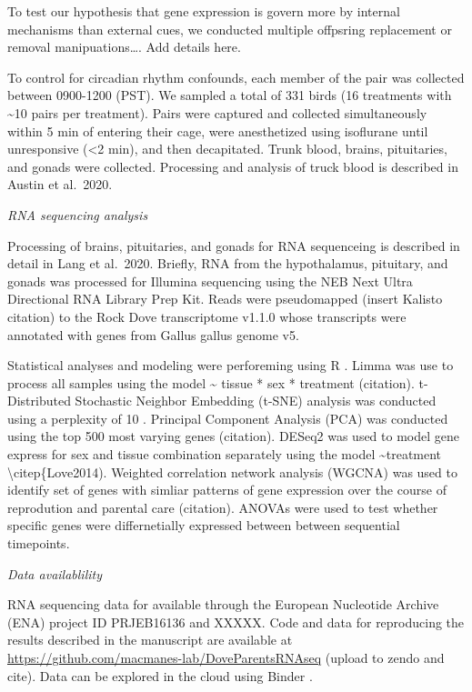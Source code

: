 To test our hypothesis that gene expression is govern more by internal
mechanisms than external cues, we conducted multiple offpsring
replacement or removal manipuations\ldots{}. Add details here.

To control for circadian rhythm confounds, each member of the pair was
collected between 0900-1200 (PST). We sampled a total of 331 birds (16
treatments with \textasciitilde{}10 pairs per treatment). Pairs were
captured and collected simultaneously within 5 min of entering their
cage, were anesthetized using isoflurane until unresponsive
(\textless{}2 min), and then decapitated. Trunk blood, brains,
pituitaries, and gonads were collected. Processing and analysis of truck
blood is described in Austin et al.~2020.

\emph{RNA sequencing analysis}

Processing of brains, pituitaries, and gonads for RNA sequenceing is
described in detail in Lang et al.~2020. Briefly, RNA from the
hypothalamus, pituitary, and gonads was processed for Illumina
sequencing using the NEB Next Ultra Directional RNA Library Prep Kit.
Reads were pseudomapped (insert Kalisto citation) to the Rock Dove
transcriptome v1.1.0 whose transcripts were annotated with genes from
Gallus gallus genome v5.

Statistical analyses and modeling were perforeming using R
\citep{RDevelopmentCoreTeam2013, Wickham2016}. Limma was use to process
all samples using the model \textasciitilde{} tissue * sex * treatment
(citation). t-Distributed Stochastic Neighbor Embedding (t-SNE) analysis
was conducted using a perplexity of 10 \citep{VanDerMaaten2008}.
Principal Component Analysis (PCA) was conducted using the top 500 most
varying genes (citation). DESeq2 was used to model gene express for sex
and tissue combination separately using the model
\textasciitilde{}treatment \textbackslash{}citep\{Love2014). Weighted
correlation network analysis (WGCNA) was used to identify set of genes
with simliar patterns of gene expression over the course of reprodution
and parental care (citation). ANOVAs were used to test whether specific
genes were differnetially expressed between between sequential
timepoints.

\emph{Data availablility}

RNA sequencing data for available through the European Nucleotide
Archive (ENA) project ID PRJEB16136 and XXXXX. Code and data for
reproducing the results described in the manuscript are available at
\url{https://github.com/macmanes-lab/DoveParentsRNAseq} (upload to zendo
and cite). Data can be explored in the cloud using Binder
\citep{project_jupyter-proc-scipy-2018}.


